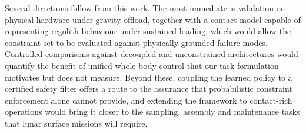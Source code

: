 Several directions follow from this work. The most immediate is validation on physical hardware under gravity offload, together with a contact model capable of representing regolith behaviour under sustained loading, which would allow the constraint set to be evaluated against physically grounded failure modes. Controlled comparisons against decoupled and unconstrained architectures would quantify the benefit of unified whole-body control that our task formulation motivates but does not measure. Beyond these, coupling the learned policy to a certified safety filter offers a route to the assurance that probabilistic constraint enforcement alone cannot provide, and extending the framework to contact-rich operations would bring it closer to the sampling, assembly and maintenance tasks that lunar surface missions will require.
